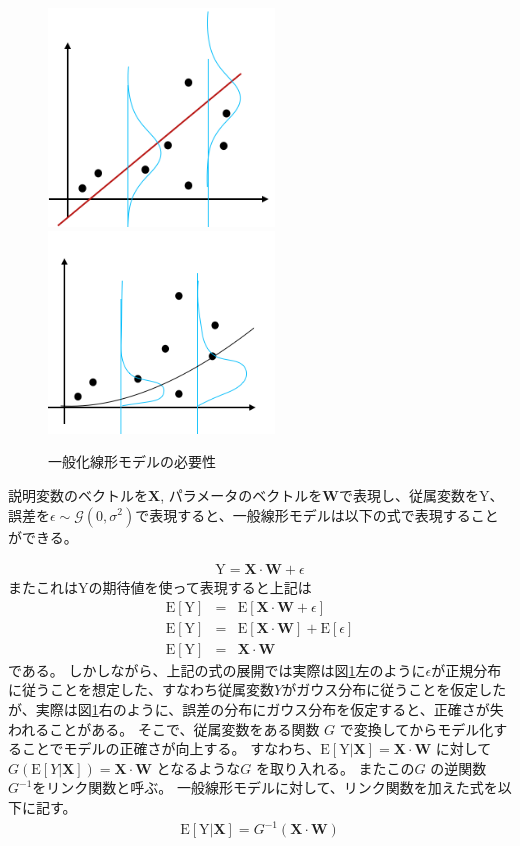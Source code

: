 \begin{figure}[hbtp]
        \includegraphics[width=6cm]{asset/glm1.png}~~~~~ ~~~~~ 
        \includegraphics[width=6cm]{asset/glm2.png}
            \caption{一般化線形モデルの必要性}
            \label{glm}
\end{figure}

説明変数のベクトルを$ \mathbf{X} $, パラメータのベクトルを$ \mathbf{W} $で表現し、従属変数を$ \mathrm{Y} $、誤差を$ \epsilon \sim \mathcal{G}(0, \sigma^2) $で表現すると、一般線形モデルは以下の式で表現することができる。

\begin{eqnarray}
\mathrm{Y}= \mathbf{X} \cdot  \mathbf{W} + \epsilon
\label{eq:senkei}
\end{eqnarray}
またこれは$ \mathrm{Y}$の期待値を使って表現すると上記は
\begin{eqnarray}
    \mathrm{E}[\mathrm{Y}] &=& \mathrm{E}[\mathbf{X} \cdot  \mathbf{W} + \epsilon] \\
    \mathrm{E}[\mathrm{Y}] &=& \mathrm{E}[\mathbf{X} \cdot  \mathbf{W}] + \mathrm{E}[\epsilon] \\
    \mathrm{E}[\mathrm{Y}] &=& \mathbf{X} \cdot  \mathbf{W}
\label{eq:link}
\end{eqnarray}
である。
しかしながら、上記の式の展開では実際は図\ref{glm}左のように$ \epsilon $が正規分布に従うことを想定した、すなわち従属変数$ Y $がガウス分布に従うことを仮定したが、実際は図\ref{glm}右のように、誤差の分布にガウス分布を仮定すると、正確さが失われることがある。
そこで、従属変数をある関数 $ G $ で変換してからモデル化することでモデルの正確さが向上する。
すなわち、$ \mathrm{E}[\mathrm{Y}|\mathbf{X}] = \mathbf{X} \cdot  \mathbf{W} $ に対して$ G(\mathrm{E}[Y|\mathbf{X}]) = \mathbf{X} \cdot  \mathbf{W} $ となるような$ G $ を取り入れる。
またこの$ G $ の逆関数 $ G^{-1} $をリンク関数と呼ぶ。
一般線形モデルに対して、リンク関数を加えた式を以下に記す。
\begin{eqnarray}
\mathrm{E}[\mathrm{Y}|\mathbf{X}]=G^{-1} (\mathbf{X}\cdot  \mathbf{W})
\label{eq:link}
\end{eqnarray}

